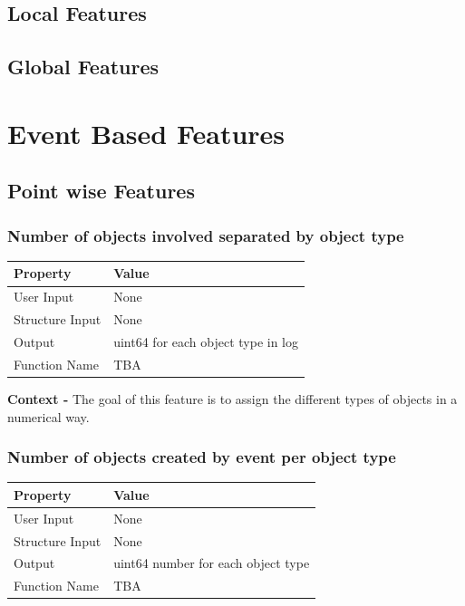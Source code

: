 \documentclass{article}
\begin{document}
\subsection{Local Features}
\subsection{Global Features}
\section{Event Based Features}
\subsection{Point wise Features}

\subsubsection{Number of objects involved separated by object type}
\begin{center}
	\begin{tabular}{| p{3cm} p{7cm} |}
		\hline
		\textbf{Property} & \textbf{Value}\\
		\hline
		User Input & None\\
		Structure Input & None\\
		Output & uint64 for each object type in log\\
		Function Name & TBA\\
		\hline
	\end{tabular}
\end{center}

\textbf{Context -} The goal of this feature is to assign the different types of objects in a numerical way.
\\

\subsubsection{Number of objects created by event per object type}
\begin{center}
	\begin{tabular}{| p{3cm} p{7cm} |}
		\hline
		\textbf{Property} & \textbf{Value}\\
		\hline
		User Input & None\\
		Structure Input & None\\
		Output & uint64 number for each object type\\
		Function Name & TBA\\
		\hline
	\end{tabular}
\end{center}
\end{document}
